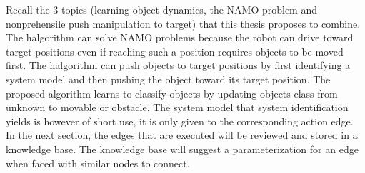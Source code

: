 Recall the 3 topics (learning object dynamics, the \ac{NAMO} problem and nonprehensile push manipulation to target) that this thesis proposes to combine. The \ac{halgorithm} can solve \ac{NAMO} problems because the robot can drive toward target positions even if reaching such a position requires objects to be moved first.  The \ac{halgorithm} can push objects to target positions by first identifying a system model and then pushing the object toward its target position. The proposed algorithm learns to classify objects by updating objects class from unknown to movable or obstacle. The system model that system identification yields is however of short use, it is only given to the corresponding action edge. In the next section, the edges that are executed will be reviewed and stored in a knowledge base. The knowledge base will suggest a parameterization for an edge when faced with similar nodes to connect. 

